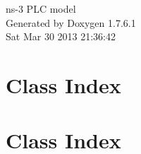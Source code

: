 \documentclass[a4paper]{book}
\begin{document}
\hypersetup{pageanchor=false,citecolor=blue}
\begin{titlepage}
\vspace*{7cm}
\begin{center}
{\Large ns-\/3 \-P\-L\-C model }\\
\vspace*{1cm}
{\large \-Generated by Doxygen 1.7.6.1}\\
\vspace*{0.5cm}
{\small Sat Mar 30 2013 21:36:42}\\
\end{center}
\end{titlepage}
\clearemptydoublepage
{}
\tableofcontents
\clearemptydoublepage
{}
\hypersetup{pageanchor=true,citecolor=blue}
\chapter{\-Class \-Index}

\chapter{\-Class \-Index}

\end{document}
